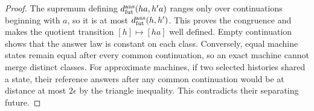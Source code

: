 \begin{proof}
The supremum defining $d_{\rm fut}^{\rm ans}(ha,h'a)$ ranges only over
continuations beginning with $a$, so it is at most
$d_{\rm fut}^{\rm ans}(h,h')$. This proves the congruence and makes
the quotient transition $[h]\mapsto[ha]$ well defined. Empty continuation
shows that the answer law is constant on each class. Conversely, equal
machine states remain equal after every common continuation, so an exact
machine cannot merge distinct classes. For approximate machines,
if two selected histories shared a state, their reference answers after
any common continuation would be at distance at most $2\epsilon$ by the
triangle inequality. This contradicts their separating future.
\end{proof}
